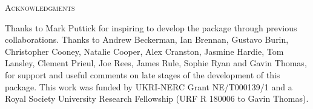 \documentclass[12pt,letterpaper]{article}
\renewcommand{\section}[1]{%
\bigskip
\begin{center}
\begin{Large}
\normalfont\scshape #1
\medskip
\end{Large}
\end{center}}
\begin{document}
\section{Acknowledgments}
Thanks to Mark Puttick for inspiring to develop the package through previous collaborations. Thanks to Andrew Beckerman, Ian Brennan, Gustavo Burin, Christopher Cooney, Natalie Cooper, Alex Cranston, Jasmine Hardie, Tom Lansley, Clement Prieul, Joe Rees, James Rule, Sophie Ryan and Gavin Thomas, for support and useful comments on late stages of the development of this package. This work was funded by UKRI-NERC Grant NE/T000139/1 and a Royal Society University Research Fellowship (URF R 180006 to Gavin Thomas).



\end{document}
